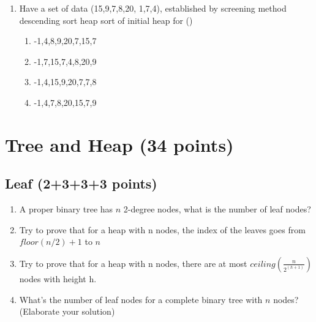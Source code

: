 \documentclass[11pt]{exam}
\begin{document}
\begin{enumerate}
\begin{enumerate}
          \end{enumerate}
          \begin{solution}
          \end{solution}
    \item Have a set of data (15,9,7,8,20, 1,7,4), established by screening method descending sort heap sort of initial heap for ()
          \begin{enumerate}
              \item  -1,4,8,9,20,7,15,7
              \item  -1,7,15,7,4,8,20,9
              \item  -1,4,15,9,20,7,7,8
              \item  -1,4,7,8,20,15,7,9
          \end{enumerate}
          \begin{solution}
          \end{solution}
\end{enumerate}
\section{Tree and Heap (34 points) }
\subsection{Leaf (2+3+3+3 points)}
\begin{enumerate}
    \item
          A proper binary tree has $n$ 2-degree nodes, what is the number of leaf nodes?
          \begin{solution}
          \end{solution}
    \item
          Try to prove that for a heap with n nodes, the index of the leaves goes from $floor(n/2)+1$ to $n$
          \begin{solution}
          \end{solution}
    \item
          Try to prove that for a heap with n nodes, there are at most $ceiling(\frac{n}{2^{(h+1)}})$ nodes with height h.
          \begin{solution}
          \end{solution}
    \item  What's the number of leaf nodes for a complete binary tree with $n$ nodes? (Elaborate your solution)
          \begin{solution}
          \end{solution}

\end{enumerate}
\end{document}
